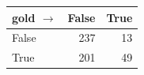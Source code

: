 \begin{tabular}{lrr}
\toprule
gold $\to$  & False & True \\
\midrule
False & 237 & 13 \\
True & 201 & 49 \\
\bottomrule
\end{tabular}
